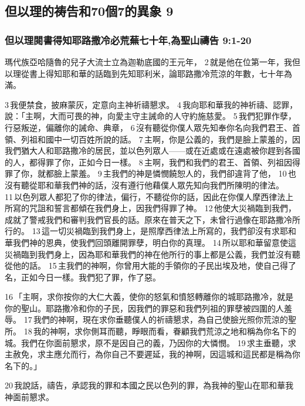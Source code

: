 \subsection{但以理的祷告和70個7的異象 9}
\subsubsection{但以理閱書得知耶路撒冷必荒蕪七十年,為聖山禱告 9:1-20}
瑪代族亞哈隨魯的兒子大流士立為迦勒底國的王元年， 2 就是他在位第一年，我但以理從書上得知耶和華的話臨到先知耶利米，論耶路撒冷荒涼的年數，七十年為滿。

3 我便禁食，披麻蒙灰，定意向主神祈禱懇求。 4 我向耶和華我的神祈禱、認罪，說：「主啊，大而可畏的神，向愛主守主誡命的人守約施慈愛。 5 我們犯罪作孽，行惡叛逆，偏離你的誡命、典章， 6 沒有聽從你僕人眾先知奉你名向我們君王、首領、列祖和國中一切百姓所說的話。 7 主啊，你是公義的，我們是臉上蒙羞的，因我們猶大人和耶路撒冷的居民，並以色列眾人——或在近處或在遠處被你趕到各國的人，都得罪了你，正如今日一樣。 8 主啊，我們和我們的君王、首領、列祖因得罪了你，就都臉上蒙羞。 9 主我們的神是憐憫饒恕人的，我們卻違背了他， 10 也沒有聽從耶和華我們神的話，沒有遵行他藉僕人眾先知向我們所陳明的律法。 11 以色列眾人都犯了你的律法，偏行，不聽從你的話，因此在你僕人摩西律法上所寫的咒詛和誓言都傾在我們身上，因我們得罪了神。 12 他使大災禍臨到我們，成就了警戒我們和審判我們官長的話。原來在普天之下，未曾行過像在耶路撒冷所行的。 13 這一切災禍臨到我們身上，是照摩西律法上所寫的，我們卻沒有求耶和華我們神的恩典，使我們回頭離開罪孽，明白你的真理。 14 所以耶和華留意使這災禍臨到我們身上，因為耶和華我們的神在他所行的事上都是公義，我們並沒有聽從他的話。 15 主我們的神啊，你曾用大能的手領你的子民出埃及地，使自己得了名，正如今日一樣。我們犯了罪，作了惡。

16 「主啊，求你按你的大仁大義，使你的怒氣和憤怒轉離你的城耶路撒冷，就是你的聖山。耶路撒冷和你的子民，因我們的罪惡和我們列祖的罪孽被四圍的人羞辱。 17 我們的神啊，現在求你垂聽僕人的祈禱懇求，為自己使臉光照你荒涼的聖所。 18 我的神啊，求你側耳而聽，睜眼而看，眷顧我們荒涼之地和稱為你名下的城。我們在你面前懇求，原不是因自己的義，乃因你的大憐憫。 19 求主垂聽，求主赦免，求主應允而行，為你自己不要遲延，我的神啊，因這城和這民都是稱為你名下的。」

20 我說話，禱告，承認我的罪和本國之民以色列的罪，為我神的聖山在耶和華我神面前懇求。


 

